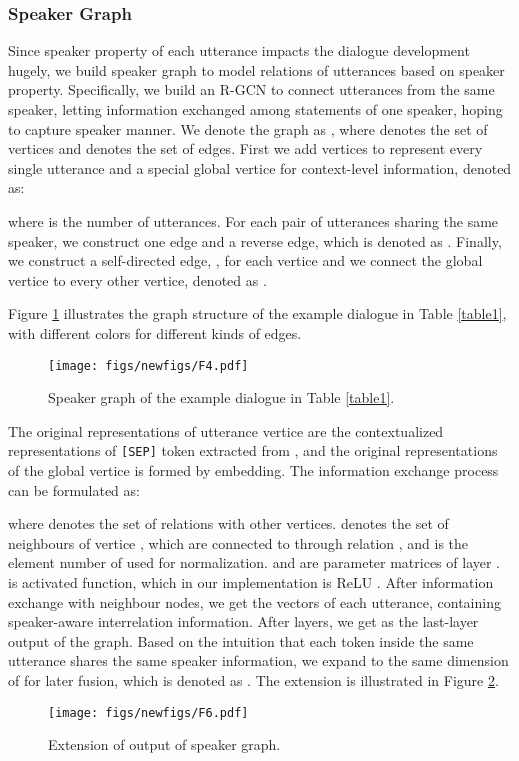 \documentclass[letterpaper]{article} \usepackage{stylefile}  \usepackage{times}  \usepackage{helvet}  \usepackage{courier}  \usepackage[hyphens]{url}  \usepackage{graphicx} \urlstyle{rm} \def\UrlFont{\rm}  \usepackage{natbib}  \usepackage{caption} \DeclareCaptionStyle{ruled}{labelfont=normalfont,labelsep=colon,strut=off} \frenchspacing  \setlength{\pdfpagewidth}{8.5in}  \setlength{\pdfpageheight}{11in}  \usepackage{algorithm}
\begin{document}
\subsubsection{Speaker Graph}
Since speaker property of each utterance impacts the dialogue development hugely, we build speaker graph to model relations of utterances based on speaker property. Specifically, we build an R-GCN to connect utterances from the same speaker, letting information exchanged among statements of one speaker, hoping to capture speaker manner. We denote the graph as , where  denotes the set of vertices and  denotes the set of edges. First we add vertices  to represent every single utterance and a special global vertice  for context-level information, denoted as: 

where  is the number of utterances. For each pair of utterances sharing the same speaker, we construct one edge and a reverse edge, which is denoted as . Finally, we construct a self-directed edge,  , for each vertice and we connect the global vertice to every other vertice, denoted as . 

Figure \ref{sg} illustrates the graph structure of the example dialogue in Table \ref{table1}, with different colors for different kinds of edges.
\begin{figure}[htb]
		\centering
		\texttt{[image: figs/newfigs/F4.pdf]}
		\caption{\label{sg} Speaker graph of the example dialogue in Table \ref{table1}.}
\end{figure}
The original representations of utterance vertice are the contextualized representations of \texttt{[SEP]} token extracted from , and the original representations of the global vertice is formed by embedding. The information exchange process can be formulated as:

where  denotes the set of relations with other vertices.  denotes the set of neighbours of vertice , which are connected to  through relation , and  is the element number of  used for normalization.  and  are parameter matrices of layer .  is activated function, which in our implementation is ReLU \cite{glorot2011deep, agarap2018deep}. After information exchange with neighbour nodes, we get the vectors of each utterance, containing speaker-aware interrelation information. After  layers, we get  as the last-layer output of the graph. Based on the intuition that each token inside the same utterance shares the same speaker information, we expand  to the same dimension of  for later fusion, which is denoted as
. The extension is illustrated in Figure \ref{extend1}.
\begin{figure}[hbt]
		\centering
		\texttt{[image: figs/newfigs/F6.pdf]}
		\caption{\label{extend1} Extension of output of speaker graph.}
\end{figure}
\end{document}
